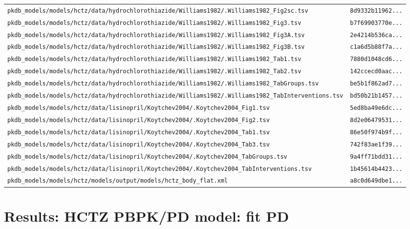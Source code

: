 \begin{longtable}{ll}
\texttt{pkdb\_models/models/hctz/data/hydrochlorothiazide/Williams1982/.Williams1982\_Fig2sc.tsv} & \texttt{8d9332b11962...} \\
\texttt{pkdb\_models/models/hctz/data/hydrochlorothiazide/Williams1982/.Williams1982\_Fig3.tsv} & \texttt{b7f69903770e...} \\
\texttt{pkdb\_models/models/hctz/data/hydrochlorothiazide/Williams1982/.Williams1982\_Fig3A.tsv} & \texttt{2e4214b536ca...} \\
\texttt{pkdb\_models/models/hctz/data/hydrochlorothiazide/Williams1982/.Williams1982\_Fig3B.tsv} & \texttt{c1a6d5b88f7a...} \\
\texttt{pkdb\_models/models/hctz/data/hydrochlorothiazide/Williams1982/.Williams1982\_Tab1.tsv} & \texttt{7880d1048cd6...} \\
\texttt{pkdb\_models/models/hctz/data/hydrochlorothiazide/Williams1982/.Williams1982\_Tab2.tsv} & \texttt{142ccecd0aac...} \\
\texttt{pkdb\_models/models/hctz/data/hydrochlorothiazide/Williams1982/.Williams1982\_TabGroups.tsv} & \texttt{be5b1f862ad7...} \\
\texttt{pkdb\_models/models/hctz/data/hydrochlorothiazide/Williams1982/.Williams1982\_TabInterventions.tsv} & \texttt{bd50b21b1457...} \\
\texttt{pkdb\_models/models/hctz/data/lisinopril/Koytchev2004/.Koytchev2004\_Fig1.tsv} & \texttt{5ed8ba49e6dc...} \\
\texttt{pkdb\_models/models/hctz/data/lisinopril/Koytchev2004/.Koytchev2004\_Fig2.tsv} & \texttt{8d2e06479531...} \\
\texttt{pkdb\_models/models/hctz/data/lisinopril/Koytchev2004/.Koytchev2004\_Tab1.tsv} & \texttt{86e50f974b9f...} \\
\texttt{pkdb\_models/models/hctz/data/lisinopril/Koytchev2004/.Koytchev2004\_Tab3.tsv} & \texttt{742f83ae1f39...} \\
\texttt{pkdb\_models/models/hctz/data/lisinopril/Koytchev2004/.Koytchev2004\_TabGroups.tsv} & \texttt{9a4ff71bdd31...} \\
\texttt{pkdb\_models/models/hctz/data/lisinopril/Koytchev2004/.Koytchev2004\_TabInterventions.tsv} & \texttt{1b45614b4423...} \\
\texttt{pkdb\_models/models/hctz/models/output/models/hctz\_body\_flat.xml} & \texttt{a8c0d649dbe1...} \\
\end{longtable}

\section{Results: HCTZ PBPK/PD model: fit PD}

